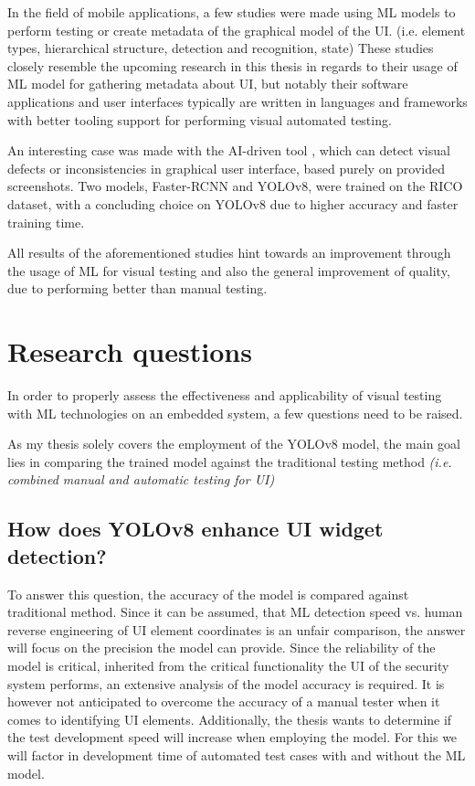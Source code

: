 \documentclass[Proposal,BIC,english,fhCitStyle,IEEE]{BASE/twbook} %
\begin{document}
In the field of mobile applications, a few studies were made using ML models to perform testing or create metadata of the graphical model of the UI. (i.e. element types, hierarchical structure, detection and recognition, state)
\autocite{altinbasGUIElementDetection2022,chengMobileApplicationGUI2021,liWidgetCaptioningGenerating2020,selcukComparisonYOLOv5YOLOv82023,zhangDeepLearningBasedMobile2020,zhangMachineVisionbasedTesting2022}
These studies closely resemble the upcoming research in this thesis in regards to their usage of ML model for gathering metadata about UI, but notably their software applications and user interfaces typically are written in languages and frameworks with better tooling support for performing visual automated testing.

An interesting case was made with the AI-driven tool \autocite{gamalOwlEyeAIDriven2023}, which can detect visual defects or inconsistencies in graphical user interface, based purely on provided screenshots. Two models, Faster-RCNN and YOLOv8, were trained on the RICO dataset, with a concluding choice on YOLOv8 due to higher accuracy and faster training time.

All results of the aforementioned studies hint towards an improvement through the usage of ML for visual testing and also the general improvement of quality, due to performing better than manual testing.

\newpage
\chapter{Research questions}
In order to properly assess the effectiveness and applicability of visual testing with ML technologies on an embedded system, a few questions need to be raised.

As my thesis solely covers the employment of the YOLOv8 model, the main goal lies in comparing the trained model against the traditional testing method \emph{(i.e. combined manual and automatic testing for UI)}
\section{How does YOLOv8 enhance UI widget detection?}
To answer this question, the accuracy of the model is compared against traditional method. Since it can be assumed, that ML detection speed vs. human reverse engineering of UI element coordinates is an unfair comparison, the answer will focus on the precision the model can provide.
Since the reliability of the model is critical, inherited from the critical functionality the UI of the security system performs, an extensive analysis of the model accuracy is required.
It is however not anticipated to overcome the accuracy of a manual tester when it comes to identifying UI elements.
Additionally, the thesis wants to determine if the test development speed will increase when employing the model. For this we will factor in development time of automated test cases with and without the ML model.
\end{document}
